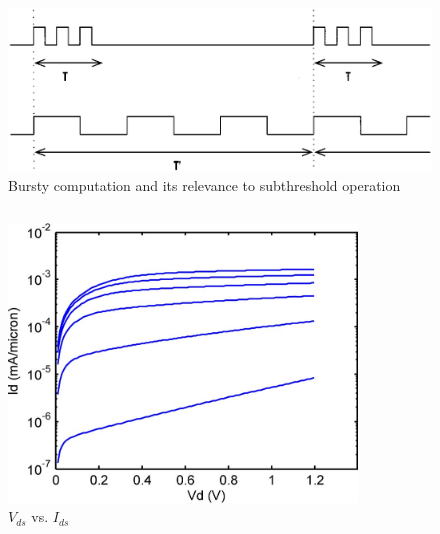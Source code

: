 \begin{figure}
	\centering
	\includegraphics[width=\columnwidth]{../../images/burstycomputation.png}
	\caption{Bursty computation and its relevance to subthreshold operation \cite{IEEEVLSIRobustSTL}}
	\label{fig:burstST}
\end{figure}

\begin{columns}
	\begin{column}{0.5\textwidth}
		\begin{figure}
			\includegraphics[width=350px]{../../images/vgsvsids.png}
			\caption{$V_{ds}$ vs. $I_{ds}$ \cite{SemiEmpiricalModels}}
			\label{fig:VgsIds}
		\end{figure}
	\end{column}
	\begin{column}{0.5\textwidth}
	\end{column}
\end{columns}

